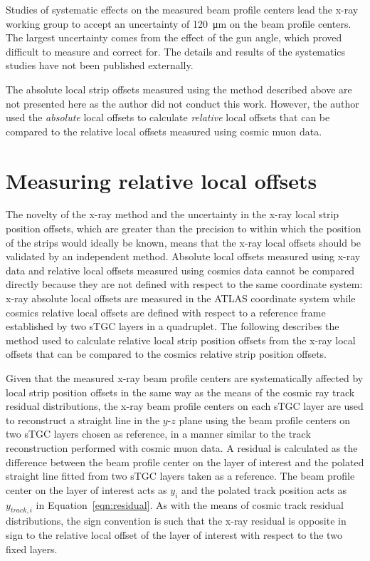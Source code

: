 Studies of systematic effects on the measured beam profile centers lead the x-ray working group to accept an uncertainty of \SI{120}{\micro\meter} on the beam profile centers. The largest uncertainty comes from the effect of the gun angle, which proved difficult to measure and correct for. The details and results of the systematics studies have not been published externally. 

The absolute local strip offsets measured using the method described above are not presented here as the author did not conduct this work. However, the author used the {\em absolute} local offsets to calculate {\em relative} local offsets that can be compared to the relative local offsets measured using cosmic muon data.

\section{Measuring relative local offsets}

The novelty of the x-ray method and the uncertainty in the x-ray local strip position offsets, which are greater than the precision to within which the position of the strips would ideally be known, means that the x-ray local offsets should be validated by an independent method. Absolute local offsets measured using x-ray data and relative local offsets measured using cosmics data cannot be compared directly because they are not defined with respect to the same coordinate system: x-ray absolute local offsets are measured in the ATLAS coordinate system while cosmics relative local offsets are defined with respect to a reference frame established by two sTGC layers in a quadruplet. The following describes the method used to calculate relative local strip position offsets from the x-ray local offsets that can be compared to the cosmics relative strip position offsets.

Given that the measured x-ray beam profile centers are systematically affected by local strip position offsets in the same way as the means of the cosmic ray track residual distributions, the x-ray beam profile centers on each sTGC layer are used to reconstruct a straight line in the $y$-$z$ plane using the beam profile centers on two sTGC layers chosen as reference, in a manner similar to the track reconstruction performed with cosmic muon data. A residual is calculated as the difference between the beam profile center on the layer of interest and the polated straight line fitted from two sTGC layers taken as a reference. The beam profile center on the layer of interest acts as $y_{i}$ and the polated track position acts as $y_{track, i}$ in Equation~\ref{eqn:residual}.  As with the means of cosmic track residual distributions, the sign convention is such that the x-ray residual is opposite in sign to the relative local offset of the layer of interest with respect to the two fixed layers. 

